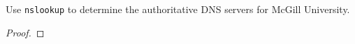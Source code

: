 \documentclass[../../main.tex]{subfiles}
\begin{document}
\begin{wts}
Use \lstinline{nslookup} to determine the authoritative DNS servers for McGill University.
\end{wts}
\begin{proof}

\end{proof}
\end{document}
